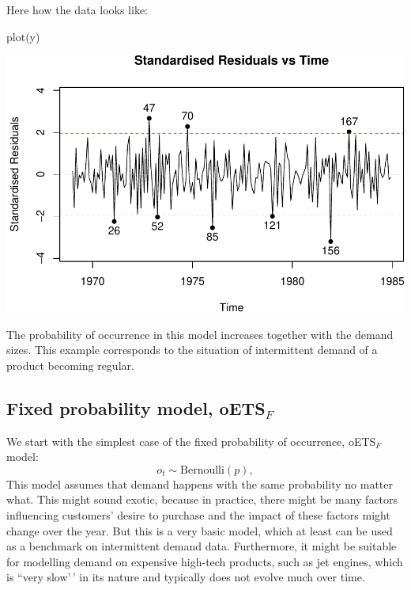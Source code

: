 \documentclass[
]{book}
\newenvironment{Shaded}{\begin{snugshade}}{\end{snugshade}}
\newcommand{\FunctionTok}[1]{\textcolor[rgb]{0.00,0.00,0.00}{#1}}
\newcommand{\NormalTok}[1]{#1}
\theoremstyle{definition}
\theoremstyle{definition}
\theoremstyle{definition}
\theoremstyle{definition}
\theoremstyle{remark}
\begin{document}
Here how the data looks like:

\begin{Shaded}
\begin{Highlighting}[]
\FunctionTok{plot}\NormalTok{(y)}
\end{Highlighting}
\end{Shaded}

\includegraphics{adam_files/figure-latex/unnamed-chunk-118-1.pdf}

The probability of occurrence in this model increases together with the demand sizes. This example corresponds to the situation of intermittent demand of a product becoming regular.

\hypertarget{fixed-probability-model-oets_f}{%
\subsection{\texorpdfstring{Fixed probability model, oETS\(_F\)}{Fixed probability model, oETS\_F}}\label{fixed-probability-model-oets_f}}

We start with the simplest case of the fixed probability of occurrence, oETS\(_F\) model:
\begin{equation}
    o_t \sim \text{Bernoulli}(p) ,
    \label{eq:oETSFixed}
\end{equation}
This model assumes that demand happens with the same probability no matter what. This might sound exotic, because in practice, there might be many factors influencing customers' desire to purchase and the impact of these factors might change over the year. But this is a very basic model, which at least can be used as a benchmark on intermittent demand data. Furthermore, it might be suitable for modelling demand on expensive high-tech products, such as jet engines, which is ``very slow'\,' in its nature and typically does not evolve much over time.
\end{document}
